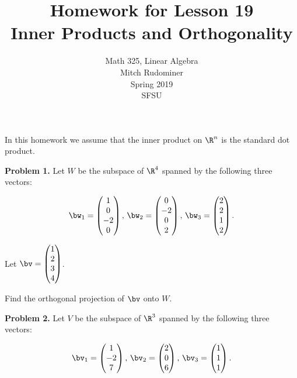 \documentclass[oneside,12pt]{amsart}
\begin{document}
\title{Homework for Lesson 19 \\ Inner Products and Orthogonality}
\author{Math 325, Linear Algebra \\ Mitch Rudominer \\ Spring 2019 \\ SFSU }
\date{}

\maketitle

\bigskip

In this homework we assume that the inner product on $\R^n$ is the standard
dot product.

\bigskip

\textbf{Problem 1.} Let $W$ be the subspace of $\R^4$ spanned by the
following three vectors:

$$
\bw_1=
\begin{pmatrix}
1  \\
0  \\
-2 \\
0
\end{pmatrix}
\text{, }
\bw_2=
\begin{pmatrix}
0 \\
-2\\
0 \\
2
\end{pmatrix}
\text{, }
\bw_3=
\begin{pmatrix}
2 \\
2 \\
1 \\
2
\end{pmatrix}
.$$

Let $\bv=
\begin{pmatrix}
1 \\
2 \\
3 \\
4
\end{pmatrix}
$.

\bigskip

Find the orthogonal projection of $\bv$ onto $W$.

\bigskip
\bigskip
\bigskip
\bigskip

\textbf{Problem 2.} Let $V$ be the subspace of $\R^3$ spanned by the following
three vectors:

$$
\bv_1=
\begin{pmatrix}
1  \\
-2  \\
7   \\
\end{pmatrix}
\text{, }
\bv_2=
\begin{pmatrix}
2 \\
0\\
6 \\
\end{pmatrix}
\text{, }
\bv_3=
\begin{pmatrix}
1 \\
1 \\
1 \\
\end{pmatrix}
.$$
\end{document}
